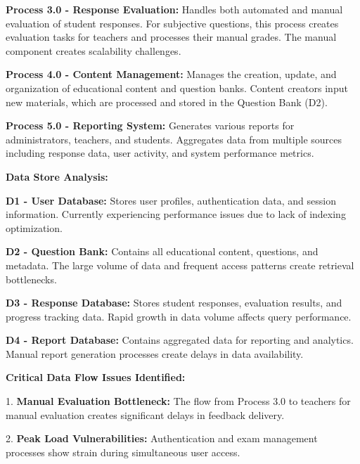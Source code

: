 \documentclass[12pt,a4paper,oneside]{book}
\begin{document}
\vspace{0.3cm}
\textbf{Process 3.0 - Response Evaluation:} Handles both automated and manual evaluation of student responses. For subjective questions, this process creates evaluation tasks for teachers and processes their manual grades. The manual component creates scalability challenges.

\vspace{0.3cm}
\textbf{Process 4.0 - Content Management:} Manages the creation, update, and organization of educational content and question banks. Content creators input new materials, which are processed and stored in the Question Bank (D2).

\vspace{0.3cm}
\textbf{Process 5.0 - Reporting System:} Generates various reports for administrators, teachers, and students. Aggregates data from multiple sources including response data, user activity, and system performance metrics.

\vspace{0.5cm}
\textbf{Data Store Analysis:}

\textbf{D1 - User Database:} Stores user profiles, authentication data, and session information. Currently experiencing performance issues due to lack of indexing optimization.

\vspace{0.3cm}
\textbf{D2 - Question Bank:} Contains all educational content, questions, and metadata. The large volume of data and frequent access patterns create retrieval bottlenecks.

\vspace{0.3cm}
\textbf{D3 - Response Database:} Stores student responses, evaluation results, and progress tracking data. Rapid growth in data volume affects query performance.

\vspace{0.3cm}
\textbf{D4 - Report Database:} Contains aggregated data for reporting and analytics. Manual report generation processes create delays in data availability.

\vspace{0.5cm}
\textbf{Critical Data Flow Issues Identified:}

1. \textbf{Manual Evaluation Bottleneck:} The flow from Process 3.0 to teachers for manual evaluation creates significant delays in feedback delivery.

\vspace{0.3cm}
2. \textbf{Peak Load Vulnerabilities:} Authentication and exam management processes show strain during simultaneous user access.
\end{document}
